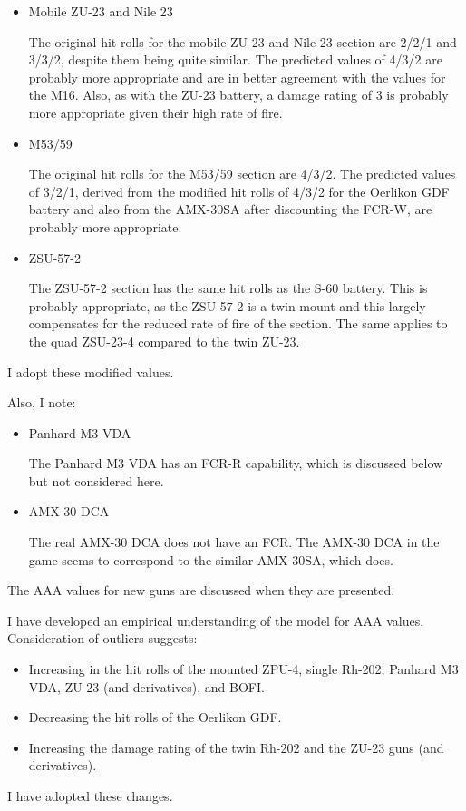 {\begin{itemize}
        \item Mobile ZU-23 and Nile 23

            The original hit rolls for the mobile ZU-23 and Nile 23 section are 2/2/1 and 3/3/2, despite them being quite similar. The predicted values of 4/3/2 are probably more appropriate and are in better agreement with the values for the M16. Also, as with the ZU-23 battery, a damage rating of 3 is probably more appropriate given their high rate of fire.

        \item M53/59

            The original hit rolls for the M53/59 section are 4/3/2. The predicted values of 3/2/1, derived from the modified hit rolls of 4/3/2 for the Oerlikon GDF battery and also from the AMX-30SA after discounting the FCR-W, are probably more appropriate.

        \item ZSU-57-2

            The ZSU-57-2 section has the same hit rolls as the S-60 battery. This is probably appropriate, as the ZSU-57-2 is a twin mount and this largely compensates for the reduced rate of fire of the section. The same applies to the quad ZSU-23-4 compared to the twin ZU-23.
    \end{itemize}

    I adopt these modified values.

    Also, I note:

    \begin{itemize}

        \item Panhard M3 VDA

            The Panhard M3 VDA has an FCR-R capability, which is discussed below but not considered here.

        \item AMX-30 DCA

            The real AMX-30 DCA does not have an FCR. The AMX-30 DCA in the game seems to correspond to the similar AMX-30SA, which does.

    \end{itemize}

    The AAA values for new guns are discussed when they are presented.

    I have developed an empirical understanding of the model for AAA values.
    Consideration of outliers suggests:
    \begin{itemize}
        \item Increasing in the hit rolls of the mounted ZPU-4, single Rh-202, Panhard M3 VDA, ZU-23 (and derivatives), and BOFI.
        \item Decreasing the hit rolls of the Oerlikon GDF.
        \item Increasing the damage rating of the twin Rh-202 and the ZU-23 guns (and derivatives).
    \end{itemize}
    I have adopted these changes.

}

